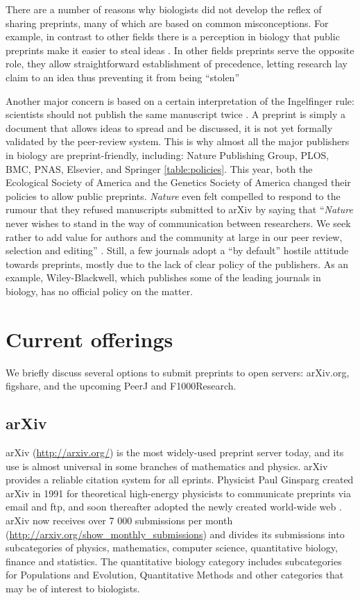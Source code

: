 \documentclass[10pt]{article}
\begin{document}
There are a number of reasons why biologists did not develop the reflex of
sharing preprints, many of which are based on common misconceptions. For
example, in contrast to other fields there is a perception in biology that
public preprints make it easier to steal ideas \cite{gin11}. In other fields
preprints serve the opposite role, they allow straightforward establishment of
precedence, letting research lay claim to an idea thus preventing it from being
``stolen'' \cite{gin11}

Another major concern is based on a certain interpretation of the Ingelfinger
rule: scientists should not publish the same manuscript twice \cite{alt96}. A
preprint is simply a document that allows ideas to spread and be discussed, it
is not yet formally validated by the peer-review system. This is why almost all
the major publishers in biology are preprint-friendly, including: Nature
Publishing Group, PLOS, BMC, PNAS, Elsevier, and Springer \ref{table:policies}.
This year, both the Ecological Society of America and the Genetics Society of
America changed their policies to allow public preprints. \emph{Nature} even
felt compelled to respond to the rumour that they refused manuscripts submitted
to arXiv by saying that ``\emph{Nature} never wishes to stand in the way of
communication between researchers. We seek rather to add value for authors and
the community at large in our peer review, selection and editing'' \cite{nat05}.
Still, a few journals adopt a ``by default'' hostile attitude towards preprints,
mostly due to the lack of clear policy of the publishers. As an example,
Wiley-Blackwell, which publishes some of the leading journals in biology, has no
official policy on the matter.

\section*{Current offerings}

We briefly discuss several options to submit preprints to open servers:
arXiv.org, figshare, and the upcoming PeerJ and F1000Research.

\subsection*{arXiv}

arXiv (\url{http://arxiv.org/}) is the most widely-used preprint server today,
and its use is almost universal in some branches of mathematics and physics.
arXiv provides a reliable citation system for all eprints. Physicist Paul
Ginsparg created arXiv in 1991 for theoretical high-energy physicists to
communicate preprints via email and ftp, and soon thereafter adopted the newly
created world-wide web \cite{jackson2002preprints}.  arXiv now receives over 7
000 submissions per month (\url{http://arxiv.org/show_monthly_submissions}) and
divides its submissions into subcategories of physics, mathematics, computer
science, quantitative biology, finance and statistics.  The quantitative biology
category includes subcategories for Populations and Evolution, Quantitative
Methods and other categories that may be of interest to biologists.
\end{document}
